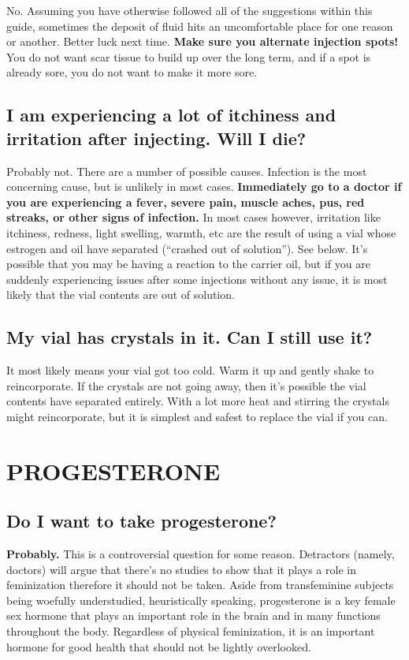 \documentclass{article}
\begin{document}
No. Assuming you have otherwise followed all of the suggestions within this guide, sometimes the deposit of fluid hits an uncomfortable place for one reason or another. Better luck next time. \textbf{Make sure you alternate injection spots!} You do not want scar tissue to build up over the long term, and if a spot is already sore, you do not want to make it more sore.

\subsection{I am experiencing a lot of itchiness and irritation after injecting. Will I die?}

Probably not. There are a number of possible causes. Infection is the most concerning cause, but is unlikely in most cases. \textbf{Immediately go to a doctor if you are experiencing a fever, severe pain, muscle aches, pus, red streaks, or other signs of infection. }In most cases however, irritation like itchiness, redness, light swelling, warmth, etc are the result of using a vial whose estrogen and oil have separated (“crashed out of solution”). See below. It’s possible that you may be having a reaction to the carrier oil, but if you are suddenly experiencing issues after some injections without any issue, it is most likely that the vial contents are out of solution.

\subsection{My vial has crystals in it. Can I still use it?}

It most likely means your vial got too cold. Warm it up and gently shake to reincorporate. If the crystals are not going away, then it’s possible the vial contents have separated entirely. With a lot more heat and stirring the crystals might reincorporate, but it is simplest and safest to replace the vial if you can.

 

\section{PROGESTERONE}

\subsection{Do I want to take progesterone?}

\textbf{Probably.} This is a controversial question for some reason. Detractors (namely, doctors) will argue that there’s no studies to show that it plays a role in feminization therefore it should not be taken. Aside from transfeminine subjects being woefully understudied, heuristically speaking, progesterone is a key female sex hormone that plays an important role in the brain and in many functions throughout the body. Regardless of physical feminization, it is an important hormone for good health that should not be lightly overlooked.
\end{document}

